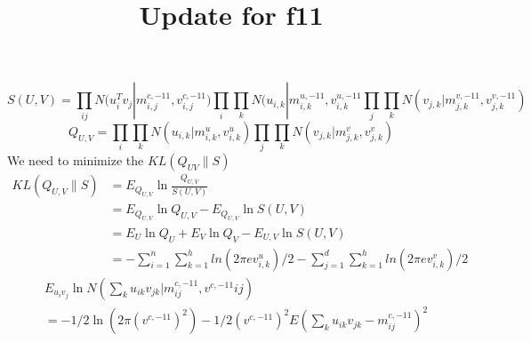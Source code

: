 \documentclass[letterpaper]{article}
\begin{document}
%
 \graphicspath{{figure/}}

\title{Update for f11}
\author{}
\maketitle
\begin{equation}
    S(U,V) = \prod_{ij}N(u_i^Tv_j|m_{i,j}^{c,-11}, v_{i,j}^{c,-11}) \prod_i \prod_k N(u_{i,k}|m_{i,k}^{u,-11}, v_{i,k}^{u,-11} \prod_j \prod_k N(v_{j,k}|m_{j,k}^{v,-11}, v_{j,k}^{v,-11})
\end{equation}
\begin{equation}
    Q_{U,V} = \prod_i \prod_k N(u_{i,k}|m_{i,k}^u, v_{i,k}^u) \prod_j \prod_k N(v_{j,k}|m_{j,k}^v, v_{j,k}^v)
\end{equation}
We need to minimize the $KL(Q_{UV}\|S)$
\begin{equation}
    \begin{split}
    KL(Q_{U,V}\|S) 
    &= E_{Q_{U,V}} \ln \frac{Q_{U,V}}{S(U,V)}\\
    &= E_{Q_{U,V}} \ln Q_{U,V} - E_{Q_{U,V}} \ln S(U,V)\\
    &= E_U \ln Q_U + E_V \ln Q_V - E_{U,V} \ln S(U,V)\\
    &=-\sum_{i=1}^n\sum_{k=1}^h ln(2\pi e v_{i,k}^u)/2 - \sum_{j=1}^d\sum_{k=1}^h ln(2\pi e v_{i,k}^v)/2
    \end{split}
\end{equation}
\begin{equation}
    \begin{split}
    &E_{u_{i}v_{j}}\ln N(\sum_k u_{ik}v_{jk}|m^{c,-11}_{ij}, v^{c,-11}{ij})\\
    &= -1/2 \ln (2\pi (v^{c,-11})^2) - 1/2(v^{c,-11})^2E(\sum_k u_{ik}v_{jk} - m_{ij}^{c,-11})^2\\
    \end{split}
\end{equation}
\end{document}
